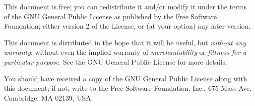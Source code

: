 \documentclass[11pt,a4paper, oneside]{book}
\begin{document}
  

\frontmatter

\maketitle

\begin{small} 
  This document is free; you can redistribute it and/or modify it
  under the terms of the GNU General Public License as published by
  the Free Software Foundation; either version 2 of the License, or
  (at your option) any later version.
 \vspace{0.5cm}
 
  This document is distributed in the hope that it will be useful, but
  \emph{without any warranty}; without even the implied warranty of
  \emph{merchantability} or \emph{fittness for a particular purpose}\@.  See the GNU
  General Public License for more details.
 \vspace{0.5cm} 
 
  You should have received a copy of the GNU General Public License
  along with this document; if not, write to the Free Software
  Foundation, Inc., 675 Mass Ave, Cambridge, MA 02139, USA.

\end{small}


\tableofcontents

\mainmatter




\end{document}
